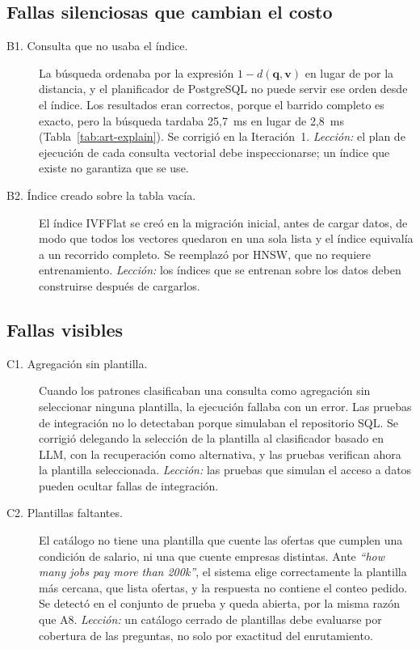 \subsection{Fallas silenciosas que cambian el costo}

\begin{description}
    \item[B1. Consulta que no usaba el índice.] La búsqueda ordenaba por la expresión $1 - d(\mathbf{q}, \mathbf{v})$ en lugar de por la distancia, y el planificador de PostgreSQL no puede servir ese orden desde el índice. Los resultados eran correctos, porque el barrido completo es exacto, pero la búsqueda tardaba 25,7~ms en lugar de 2,8~ms (Tabla~\ref{tab:art-explain}). Se corrigió en la Iteración~1. \emph{Lección:} el plan de ejecución de cada consulta vectorial debe inspeccionarse; un índice que existe no garantiza que se use.
    \item[B2. Índice creado sobre la tabla vacía.] El índice IVFFlat se creó en la migración inicial, antes de cargar datos, de modo que todos los vectores quedaron en una sola lista y el índice equivalía a un recorrido completo. Se reemplazó por HNSW, que no requiere entrenamiento. \emph{Lección:} los índices que se entrenan sobre los datos deben construirse después de cargarlos.
\end{description}

\subsection{Fallas visibles}

\begin{description}
    \item[C1. Agregación sin plantilla.] Cuando los patrones clasificaban una consulta como agregación sin seleccionar ninguna plantilla, la ejecución fallaba con un error. Las pruebas de integración no lo detectaban porque simulaban el repositorio SQL. Se corrigió delegando la selección de la plantilla al clasificador basado en LLM, con la recuperación como alternativa, y las pruebas verifican ahora la plantilla seleccionada. \emph{Lección:} las pruebas que simulan el acceso a datos pueden ocultar fallas de integración.
    \item[C2. Plantillas faltantes.] El catálogo no tiene una plantilla que cuente las ofertas que cumplen una condición de salario, ni una que cuente empresas distintas. Ante \textit{\enquote{how many jobs pay more than 200k}}, el sistema elige correctamente la plantilla más cercana, que lista ofertas, y la respuesta no contiene el conteo pedido. Se detectó en el conjunto de prueba y queda abierta, por la misma razón que A8. \emph{Lección:} un catálogo cerrado de plantillas debe evaluarse por cobertura de las preguntas, no solo por exactitud del enrutamiento.
\end{description}


